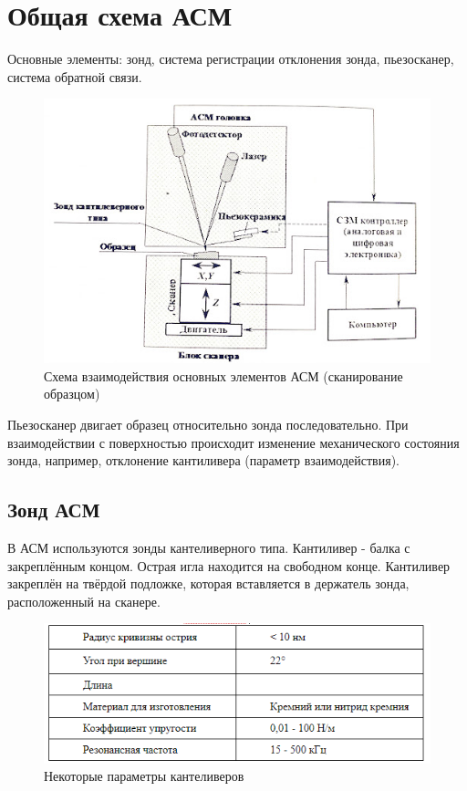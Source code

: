 \documentclass[a4paper,12pt]{article}
\theoremstyle{plain} %
\theoremstyle{definition} %
\theoremstyle{remark} %
\begin{document}
\section{Общая схема АСМ}
Основные элементы: зонд, система регистрации отклонения зонда, пьезосканер, система обратной связи.
\begin{figure}[h!]
	\centering
	\includegraphics[scale=0.6]{pic3.jpg}
	\caption{Схема взаимодействия основных элементов АСМ (сканирование образцом)}
	\label{pic3}
\end{figure}
Пьезосканер двигает образец относительно зонда последовательно. При взаимодействии с поверхностью происходит изменение механического состояния зонда, например, отклонение кантиливера (параметр взаимодействия).
\subsection{Зонд АСМ}
В АСМ используются зонды кантеливерного типа. Кантиливер - балка с закреплённым концом. Острая игла находится на свободном конце. Кантиливер закреплён на твёрдой подложке, которая вставляется в держатель зонда, расположенный на сканере. 
\begin{figure}[h!]
	\centering
	\includegraphics[scale=1]{pic4.png}
	\caption{Некоторые параметры кантеливеров}
	\label{pic4}
\end{figure}
\end{document}
